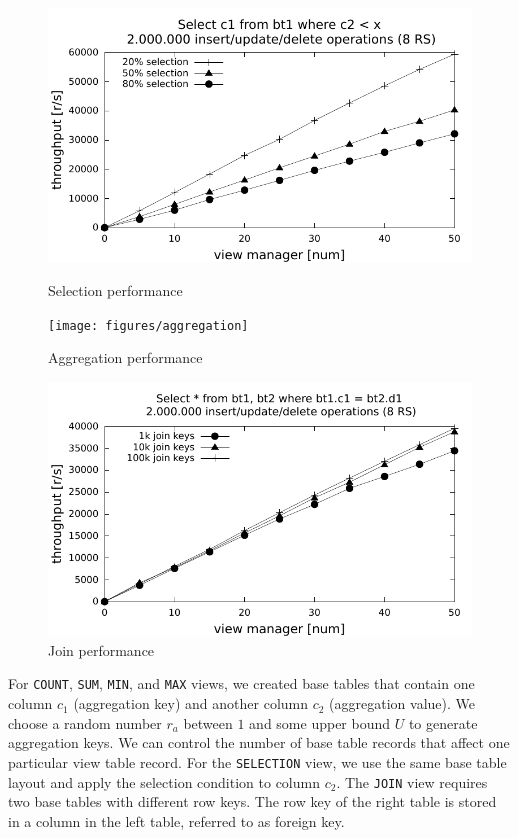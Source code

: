 \begin{figure}
  \includegraphics[width=\linewidth]{figures/selection}
      \vspace{-3mm}
  \caption{Selection performance}\label{fig:selection}
        \vspace{-1mm}
\endminipage\hfill
{}
  \texttt{[image: figures/aggregation]}
      \vspace{-3mm}
  \caption{Aggregation performance}\label{fig:viewtypes}
        \vspace{-1mm}
\endminipage\hfill
{}%
  \includegraphics[width=\linewidth]{figures/join}
      \vspace{-3mm}
  \caption{Join performance}\label{fig:join}
        \vspace{-1mm}
\endminipage
\end{figure}

For \texttt{COUNT}, \texttt{SUM}, \texttt{MIN}, and \texttt{MAX}
views, we created base tables that contain one column $c_1$
(aggregation key) and another column $c_2$ (aggregation value).  We
choose a random number $r_a$ between $1$ and some upper bound $U$ to
generate aggregation keys.  We can control the number of base table
records that affect one particular view table record. For the
\texttt{SELECTION} view, we use the same base table layout and apply
the selection condition to column $c_2$. The \texttt{JOIN} view
requires two base tables with different row keys. The row key of the
right table is stored in a column in the left table, referred to as
foreign key.

